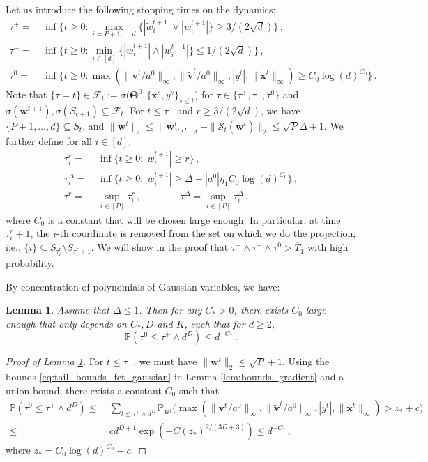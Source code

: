\documentclass[11pt]{article}
\renewcommand{\P}{\mathbb{P}}
\newcommand{\<}{\langle}
\renewcommand{\>}{\rangle}
\newtheorem{lemma}{Lemma}
\theoremstyle{definition}
\def\bv{{\boldsymbol v}}
\def\bw{{\boldsymbol w}}
\def\bx{{\boldsymbol x}}
\def\bTheta{{\boldsymbol \Theta}}
\def\cF{{\mathcal F}}
\def\cS{{\mathcal S}}
\def\bv{{\boldsymbol v}}
\def\bTheta{{\boldsymbol \Theta}}
\def\bw{{\boldsymbol w}}
\def\bx{{\boldsymbol x}}
\def\cF{{\mathcal F}}
\def\cS{{\mathcal S}}
\def\bTheta{{\boldsymbol \Theta}}
\def\oT{\overline{T}}
\def\tbv{\widetilde{\bv}}
\def\tw{\widetilde{w}}
\begin{document}
Let us introduce the following stopping times on the dynamics:
\[
\begin{aligned}
\tau^+  = &~ \inf \Big\{ t \geq 0 : \max_{ i= P+1 , \ldots , d}  \{ |\tw_i^{t+1}| \vee | w_i^{t+1} |\} \geq 3/(2 \sqrt{d}) \Big\}\, , \\
 \tau^- =&~ \inf \Big\{ t \geq 0 : \min_{ i\in [d]} \{ | \tw_i^{t+1} | \wedge | w_i^{t+1} |\} \leq 1/(2\sqrt{d} ) \Big\} \, , \\
 \tau^0 = &~ \inf \Big\{ t \geq 0 : \max(\| \bv^t / a^0 \|_\infty, \| \tbv^t / a^0 \|_\infty, | y^t |, \| \bx^t \|_\infty) \geq C_0 \log (d)^{C_0} \Big\} \, .
\end{aligned}
\]
Note that $\{ \tau = t\} \in \cF_t := \sigma \big( \bTheta^0, \{ \bx^s,y^s \}_{s \leq t} \big)$ for $\tau \in \{ \tau^+, \tau^-, \tau^0\}$ and $\sigma(\bw^{t+1}),\sigma(S_{t+1}) \subseteq \cF_t$. For $t \leq \tau^+$ and $r\geq 3/(2\sqrt{d})$, we have $\{P+1,\ldots , d\} \subseteq S_t$, and $\| \bw^t\|_2 \leq \| \bw_{1:P}^t\|_2 +\| \cS_t (\bw^t ) \|_2 \leq  \sqrt{P} \Delta + 1$. We further define for all $i\in [d]$,
\[
\begin{aligned}
\tau_i^r =&~ \inf \Big\{ t \geq 0:|  \tw_i^{t+1} | \geq r \Big\} \, , \\
\tau_i^{\Delta} =&~ \inf \Big\{ t \geq 0 :| w^{t+1}_i | \geq \Delta - |a^0| \eta_1 C_0 \log(d)^{C_0} \Big\}\, , \\
\tau^r =&~ \sup_{i \in [P]} \tau_i^r\, , \qquad \qquad\tau^\Delta =\sup_{i \in [P]} \tau_i^\Delta \, ,
\end{aligned}
\]
where $C_0$ is a constant that will be chosen large enough. In particular, at time $\tau_i^r+1$, the $i$-th coordinate is removed from the set on which we do the projection, i.e., $\{ i \} \subseteq S_{\tau_i^r } \setminus S_{\tau_i^r +1 }$. We will show in the proof that $\tau^+ \wedge \tau^- \wedge \tau^0 > \oT_1$ with high probability. 

By concentration of polynomials of Gaussian variables, we have:

\begin{lemma}\label{lem:bound_on_tau_0}
Assume that $\Delta \leq 1$. Then for any $C_* >0$, there exists $C_0$ large enough that only depends on $C_*,D$ and $K$, such that for $d \geq 2$,
\[
 \P ( \tau^0 \leq \tau^+  \wedge d^{D} ) \leq d^{-C_*} \, . 
\]
\end{lemma}


\begin{proof}[Proof of Lemma \ref{lem:bound_on_tau_0}]
For $t \leq \tau^+$, we must have $\| \bw^t \|_2 \leq \sqrt{P} + 1 $. Using the bounds \eqref{eq:tail_bounds_fct_gaussian} in Lemma \ref{lem:bounds_gradient} and a union bound, there exists a constant $C_0$ such that
\[
\begin{aligned}
\P ( \tau^0 \leq \tau^+  \wedge d^{D} )  
\leq&~ \sum_{t \leq \tau^+  \wedge d^{D} } \P_{\bw^t} \big( \max(\| \bv^t / a^0 \|_\infty, \| \tbv^t / a^0 \|_\infty, | y^t  |, \| \bx^t \|_\infty) > z_* + c  \big) \\
\leq&~ c d^{D+1} \exp ( - C (z_*)^{2/(3D +3)} ) \leq d^{-C_*}\, ,
\end{aligned}
\]
where $z_* = C_0 \log (d)^{C_0} - c$.
\end{proof}
\end{document}
